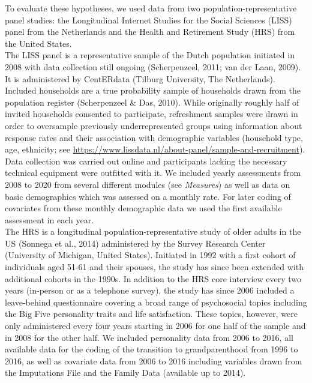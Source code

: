 \documentclass[
  english,
  man, noextraspace]{apa7}
\begin{document}
To evaluate these hypotheses, we used data from two population-representative panel studies: the Longitudinal Internet Studies for the Social Sciences (LISS) panel from the Netherlands and the Health and Retirement Study (HRS) from the United States.\\
The LISS panel is a representative sample of the Dutch population initiated in 2008 with data collection still ongoing (Scherpenzeel, 2011; van der Laan, 2009). It is administered by CentERdata (Tilburg University, The Netherlands). Included households are a true probability sample of households drawn from the population register (Scherpenzeel \& Das, 2010). While originally roughly half of invited households consented to participate, refreshment samples were drawn in order to oversample previously underrepresented groups using information about response rates and their association with demographic variables (household type, age, ethnicity; see \url{https://www.lissdata.nl/about-panel/sample-and-recruitment}). Data collection was carried out online and participants lacking the necessary technical equipment were outfitted with it. We included yearly assessments from 2008 to 2020 from several different modules (see \emph{Measures}) as well as data on basic demographics which was assessed on a monthly rate. For later coding of covariates from these monthly demographic data we used the first available assessment in each year.\\
The HRS is a longitudinal population-representative study of older adults in the US (Sonnega et al., 2014) administered by the Survey Research Center (University of Michigan, United States). Initiated in 1992 with a first cohort of individuals aged 51-61 and their spouses, the study has since been extended with additional cohorts in the 1990s. In addition to the HRS core interview every two years (in-person or as a telephone survey), the study has since 2006 included a leave-behind questionnaire covering a broad range of psychosocial topics including the Big Five personality traits and life satisfaction. These topics, however, were only administered every four years starting in 2006 for one half of the sample and in 2008 for the other half. We included personality data from 2006 to 2016, all available data for the coding of the transition to grandparenthood from 1996 to 2016, as well as covariate data from 2006 to 2016 including variables drawn from the Imputations File and the Family Data (available up to 2014).\\
\end{document}
